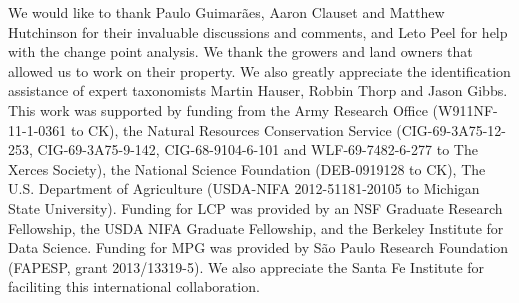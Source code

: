 \documentclass[12pt]{article}
\begin{document}
We would like to thank Paulo Guimar{\~a}es, Aaron Clauset and Matthew
Hutchinson for their invaluable discussions and comments, and Leto
Peel for help with the change point analysis.  We thank the growers
and land owners that allowed us to work on their property. We also
greatly appreciate the identification assistance of expert taxonomists
Martin Hauser, Robbin Thorp and Jason Gibbs.  This work was supported
by funding from the Army Research Office (W911NF-11-1-0361 to CK), the
Natural Resources Conservation Service (CIG-69-3A75-12-253,
CIG-69-3A75-9-142, CIG-68-9104-6-101 and WLF-69-7482-6-277 to The
Xerces Society), the National Science Foundation (DEB-0919128 to CK),
The U.S.  Department of Agriculture (USDA-NIFA 2012-51181-20105 to
Michigan State University).  Funding for LCP was provided by an NSF
Graduate Research Fellowship, the USDA NIFA Graduate Fellowship, and
the Berkeley Institute for Data Science. Funding for MPG was provided
by S{\~a}o Paulo Research Foundation (FAPESP, grant 2013/13319-5). We
also appreciate the Santa Fe Institute for faciliting this
international collaboration.




\end{document}
